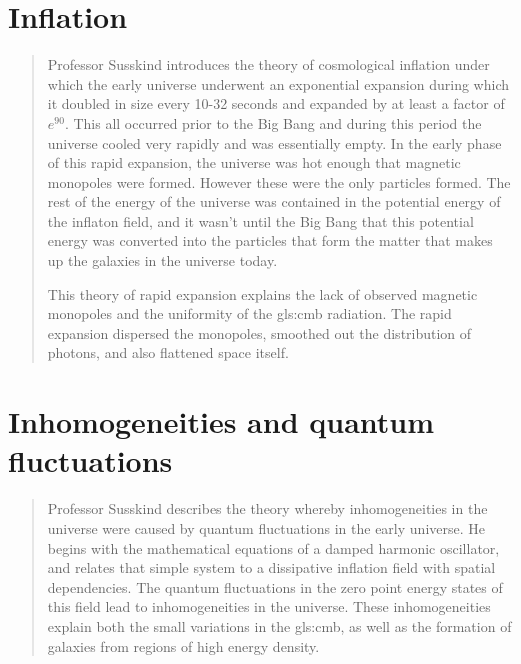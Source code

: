 \documentclass[]{article}
\begin{document}
\section{Inflation}

\begin{quotation}
	Professor Susskind introduces the theory of cosmological inflation under which the early universe underwent an exponential expansion during which it doubled in size every 10-32 seconds and expanded by at least a factor of $e^{90}$.  This all occurred prior to the Big Bang and during this period the universe cooled very rapidly and was essentially empty.  In the early phase of this rapid expansion, the universe was hot enough that magnetic monopoles were formed.  However these were the only particles formed.  The rest of the energy of the universe was contained in the potential energy of the inflaton field, and it wasn't until the Big Bang that this potential energy was converted into the particles that form the matter that makes up the galaxies in the universe today.
	
	This theory of rapid expansion explains the lack of observed magnetic monopoles and the uniformity of the \gls{gls:cmb} radiation.  The rapid expansion dispersed the monopoles, smoothed out the distribution of photons, and also flattened space itself.
	
\end{quotation}

\section{Inhomogeneities and quantum fluctuations}

\begin{quotation}
Professor Susskind describes the theory whereby inhomogeneities in the universe were caused by quantum fluctuations in the early universe.  He begins with the mathematical equations of a damped harmonic oscillator, and relates that simple system to a dissipative inflation field with spatial dependencies.  The quantum fluctuations in the zero point energy states of this field lead to inhomogeneities in the universe.  These inhomogeneities explain both the small variations in the \gls{gls:cmb}, as well as the formation of galaxies from regions of high energy density.
\end{quotation}


\printglossaries


\raggedright

\end{document}
